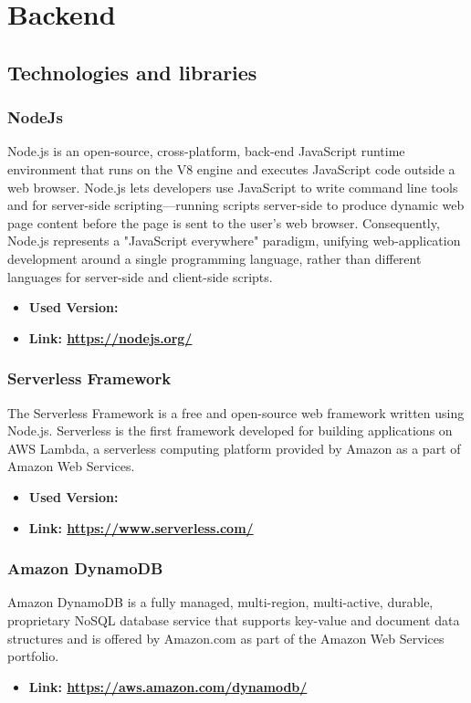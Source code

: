 \section{Backend}
\subsection{Technologies and libraries}
\subsubsection{NodeJs}
Node.js is an open-source, cross-platform, back-end JavaScript runtime environment that runs on the
V8 engine and executes JavaScript code outside a web browser. Node.js lets developers use JavaScript
to write command line tools and for server-side scripting—running scripts server-side to produce
dynamic web page content before the page is sent to the user’s web browser. Consequently, Node.js
represents a "JavaScript everywhere" paradigm, unifying web-application development around a single
programming language, rather than different languages for server-side and client-side scripts.
\begin{itemize}
    \item \textbf{Used Version:}
    \item \textbf{Link: \url{https://nodejs.org/}}
\end{itemize}
\subsubsection{Serverless Framework}
The Serverless Framework is a free and open-source web framework written using Node.js. Serverless is the first
framework developed for building applications on AWS Lambda, a serverless computing platform provided
by Amazon as a part of Amazon Web Services.
\begin{itemize}
    \item \textbf{Used Version:}
    \item \textbf{Link: \url{https://www.serverless.com/}}
\end{itemize}
\subsubsection{Amazon DynamoDB}
Amazon DynamoDB is a fully managed, multi-region, multi-active, durable, proprietary NoSQL database service that supports key-value
and document data structures and is offered by Amazon.com as part of the Amazon Web Services
portfolio.
\begin{itemize}
    \item \textbf{Link: \url{https://aws.amazon.com/dynamodb/}}
\end{itemize}
